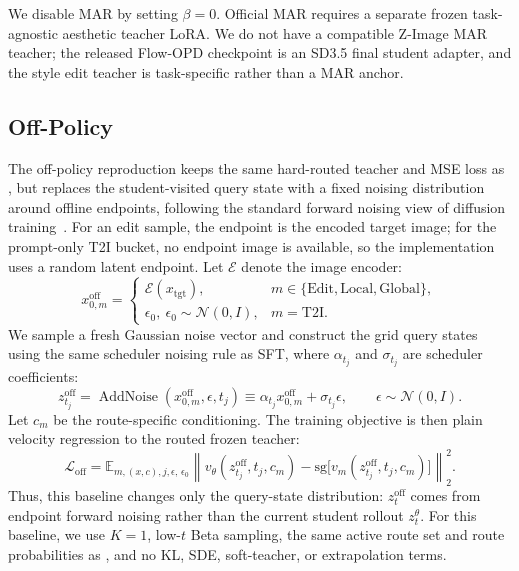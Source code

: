 We disable MAR by setting $\beta{=}0$. Official MAR requires a separate frozen task-agnostic aesthetic teacher LoRA. We do not have a compatible Z-Image MAR teacher; the released Flow-OPD checkpoint is an SD3.5 final student adapter, and the style edit teacher is task-specific rather than a MAR anchor.


\vspace{0.2cm}


\subsection{Off-Policy}
\label{app:offpolicy-reproduction}

The off-policy reproduction keeps the same hard-routed teacher and MSE loss as \name{}, but replaces the student-visited query state with a fixed noising distribution around offline endpoints, following the standard forward noising view of diffusion training~\cite{ho2020denoising}. For an edit sample, the endpoint is the encoded target image; for the prompt-only T2I bucket, no endpoint image is available, so the implementation uses a random latent endpoint. Let $\mathcal{E}$ denote the image encoder:
\begin{equation}
  x^{\mathrm{off}}_{0,m}=
  \begin{cases}
    \mathcal{E}(x_{\mathrm{tgt}}), & m\in\{\mathrm{Edit},\mathrm{Local},\mathrm{Global}\},\\
    \epsilon_0,\ \epsilon_0\sim\mathcal{N}(0,I), & m=\mathrm{T2I}.
  \end{cases}
\end{equation}
We sample a fresh Gaussian noise vector and construct the grid query states using the same scheduler noising rule as SFT, where $\alpha_{t_j}$ and $\sigma_{t_j}$ are scheduler coefficients:
\begin{equation}
  z^{\mathrm{off}}_{t_j}
  =\operatorname{AddNoise}(x^{\mathrm{off}}_{0,m},\epsilon,t_j)
  \equiv \alpha_{t_j}x^{\mathrm{off}}_{0,m}+\sigma_{t_j}\epsilon,
  \qquad \epsilon\sim\mathcal{N}(0,I).
\end{equation}
Let $c_m$ be the route-specific conditioning. The training objective is then plain velocity regression to the routed frozen teacher:
\begin{equation}
  \mathcal{L}_{\mathrm{off}}
  =\mathbb{E}_{m,(x,c),j,\epsilon,\,\epsilon_0}
  \left\|v_{\theta}(z^{\mathrm{off}}_{t_j},t_j,c_m)
  -\mathrm{sg}\!\bigl[v_m(z^{\mathrm{off}}_{t_j},t_j,c_m)\bigr]\right\|_2^2 .
\end{equation}
Thus, this baseline changes only the query-state distribution: $z^{\mathrm{off}}_{t}$ comes from endpoint forward noising rather than the current student rollout $z_t^{\theta}$. For this baseline, we use $K{=}1$, low-$t$ Beta sampling, the same active route set and route probabilities as \name{}, and no KL, SDE, soft-teacher, or extrapolation terms.


